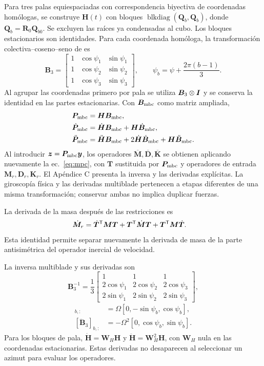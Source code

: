 Para tres palas equiespaciadas con correspondencia biyectiva de coordenadas homólogas, se construye $\bm H(t)$ con bloques $\operatorname{blkdiag}(\bm Q_b,\bm Q_b)$, donde $\bm Q_b=\bm R_0\bm Q_{b0}$. Se excluyen las raíces ya condensadas al cubo. Los bloques estacionarios son identidades. Para cada coordenada homóloga, la transformación colectiva--coseno--seno de \citet{bir2008} es
\begin{equation}
\bm B_3=\begin{bmatrix}
1&\cos\psi_1&\sin\psi_1\\
1&\cos\psi_2&\sin\psi_2\\
1&\cos\psi_3&\sin\psi_3
\end{bmatrix},\qquad
\psi_b=\psi+\frac{2\pi(b-1)}3.
\end{equation}
Al agrupar las coordenadas primero por pala se utiliza $\bm B_3\otimes\bm I$ y se conserva la identidad en las partes estacionarias. Con $\bm B_{\rm mbc}$ como matriz ampliada,
\begin{align}
\bm P_{\rm mbc}&=\bm H\bm B_{\rm mbc},\nonumber\\
\dot{\bm P}_{\rm mbc}&=\dot{\bm H}\bm B_{\rm mbc}+\bm H\dot{\bm B}_{\rm mbc},\nonumber\\
\ddot{\bm P}_{\rm mbc}&=\ddot{\bm H}\bm B_{\rm mbc}
+2\dot{\bm H}\dot{\bm B}_{\rm mbc}+\bm H\ddot{\bm B}_{\rm mbc}.
\end{align}
Al introducir $\bm z=\bm P_{\rm mbc}\bm y$, los operadores $\overline{\bm M},\overline{\bm D},\overline{\bm K}$ se obtienen aplicando nuevamente la ec.~\eqref{eq:mpc}, con $\bm T$ sustituida por $\bm P_{\rm mbc}$ y operadores de entrada $\bm M_r,\bm D_r,\bm K_r$. El Apéndice C presenta la inversa y las derivadas explícitas. La giroscopía física y las derivadas multiblade pertenecen a etapas diferentes de una misma transformación; conservar ambas no implica duplicar fuerzas.


La derivada de la masa después de las restricciones es
\begin{align}
\dot{\bm M}_r={}&\dot{\bm T}^\mathsf T\bm M\bm T+\bm T^\mathsf T\dot{\bm M}\bm T
+\bm T^\mathsf T\bm M\dot{\bm T}.
\end{align}
Esta identidad permite separar nuevamente la derivada de masa de la parte antisimétrica del operador inercial de velocidad.

La inversa multiblade y sus derivadas son
\begin{equation}
\bm B_3^{-1}=\frac13\begin{bmatrix}
1&1&1\\2\cos\psi_1&2\cos\psi_2&2\cos\psi_3\\
2\sin\psi_1&2\sin\psi_2&2\sin\psi_3
\end{bmatrix},
\end{equation}
\begin{align}
[\dot{\bm B}_3]_{b,:}&=\Omega[0,-\sin\psi_b,\cos\psi_b],\nonumber\\
[\ddot{\bm B}_3]_{b,:}&=-\Omega^2[0,\cos\psi_b,\sin\psi_b].
\end{align}
Para los bloques de pala, $\dot{\bm H}=\bm W_H\bm H$ y $\ddot{\bm H}=\bm W_H^2\bm H$, con $\bm W_H$ nula en las coordenadas estacionarias. Estas derivadas no desaparecen al seleccionar un azimut para evaluar los operadores.

